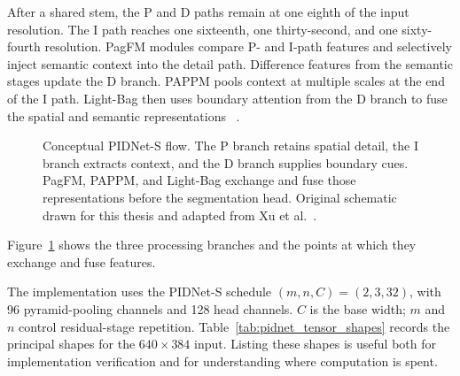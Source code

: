 After a shared stem, the P and D paths remain at one eighth of the input
resolution. The I path reaches one sixteenth, one thirty-second, and one
sixty-fourth resolution. PagFM modules compare P- and I-path features and
selectively inject semantic context into the detail path. Difference features
from the semantic stages update the D branch. PAPPM pools context at multiple
scales at the end of the I path. Light-Bag then uses boundary attention from
the D branch to fuse the spatial and semantic representations
~\cite{xu2023pidnet}.

\begin{figure}[H]
\centering
\resizebox{\textwidth}{!}{}
\caption[Conceptual PIDNet-S three-branch architecture.]{Conceptual PIDNet-S
flow. The P branch retains spatial detail, the I branch extracts context, and
the D branch supplies boundary cues. PagFM, PAPPM, and Light-Bag exchange and
fuse those representations before the segmentation head. Original schematic
drawn for this thesis and adapted from Xu et al.~\cite{xu2023pidnet}.}
\label{fig:final_pidnet_architecture}
\end{figure}

Figure~\ref{fig:final_pidnet_architecture} shows the three processing branches
and the points at which they exchange and fuse features.

The implementation uses the PIDNet-S schedule $(m,n,C)=(2,3,32)$, with 96
pyramid-pooling channels and 128 head channels. $C$ is the base width; $m$ and
$n$ control residual-stage repetition. Table~\ref{tab:pidnet_tensor_shapes}
records the principal shapes for the $640\times384$ input. Listing these
shapes is useful both for implementation verification and for understanding
where computation is spent.


